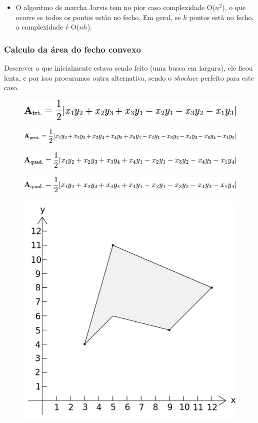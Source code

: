 \documentclass[12pt]{article}
\begin{document}
\begin{itemize}
\item O algoritmo de marcha Jarvis tem no pior caso complexidade O($n^2$), o que ocorre se todos os pontos estão no fecho. Em geral, se $h$ pontos estã no fecho, a complexidade é O($nh$).


\end{itemize}

\subsubsection{Calculo da área do fecho convexo}

Descrever o que inicialmente estava sendo feito (uma busca em largura), ele ficou lenta, e por isso procuramos outra alternativa, sendo o {\em shoelace} perfeito para este caso.

\begin{figure}[ht]
\centering
\includegraphics[width=.7\textwidth]{equacao1.png}
\label{fig:fig}
\end{figure}
\begin{figure}[ht]
\centering
\includegraphics[width=.7\textwidth]{equcao2.png}
\label{fig:fig}
\end{figure}
\begin{figure}[ht]
\centering
\includegraphics[width=.7\textwidth]{equacao4.png}
\label{fig:fig}
\end{figure}
\begin{figure}
\includegraphics[width=.7\textwidth]{equacao4.png}
\label{fig:fig}
\end{figure}
\begin{figure}
\includegraphics[width=.7\textwidth]{equacao5.png}
\label{fig:fig}
\end{figure}
\end{document}
